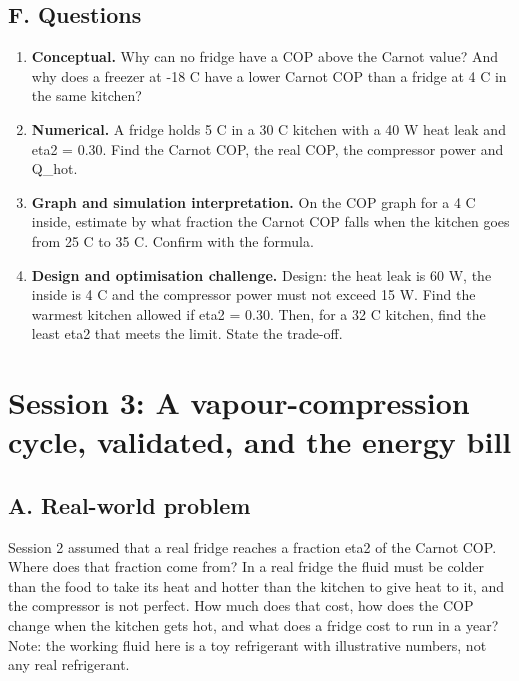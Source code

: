 \documentclass[11pt,a4paper]{article}
\begin{document}
\subsection*{F. Questions}
\begin{enumerate}[nosep]
\item \textbf{Conceptual.} Why can no fridge have a COP above the Carnot value? And why does a freezer at -18 C have a lower Carnot COP than a fridge at 4 C in the same kitchen?
\item \textbf{Numerical.} A fridge holds 5 C in a 30 C kitchen with a 40 W heat leak and eta2 = 0.30. Find the Carnot COP, the real COP, the compressor power and Q\_hot.
\item \textbf{Graph and simulation interpretation.} On the COP graph for a 4 C inside, estimate by what fraction the Carnot COP falls when the kitchen goes from 25 C to 35 C. Confirm with the formula.
\item \textbf{Design and optimisation challenge.} Design: the heat leak is 60 W, the inside is 4 C and the compressor power must not exceed 15 W. Find the warmest kitchen allowed if eta2 = 0.30. Then, for a 32 C kitchen, find the least eta2 that meets the limit. State the trade-off.
\end{enumerate}

\section{Session 3: A vapour-compression cycle, validated, and the energy bill}

\subsection*{A. Real-world problem}
Session 2 assumed that a real fridge reaches a fraction eta2 of the Carnot COP. Where does that fraction come from? In a real fridge the fluid must be colder than the food to take its heat and hotter than the kitchen to give heat to it, and the compressor is not perfect. How much does that cost, how does the COP change when the kitchen gets hot, and what does a fridge cost to run in a year? Note: the working fluid here is a toy refrigerant with illustrative numbers, not any real refrigerant.
\end{document}
